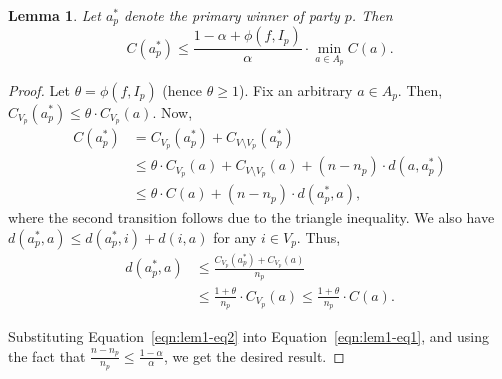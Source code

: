 \documentclass[letterpaper]{article} %
\newtheorem{lemma}[theorem]{Lemma}
\theoremstyle{definition}
\begin{document}
\begin{lemma}
\label{lem:winner-opt-same-party}
	Let $a^*_p$ denote the primary winner of party $p$. Then 
	$$
	C(a^*_p) \le \frac{1-\alpha+\phi(f,I_p)}{\alpha} \cdot \min_{a \in A_p} C(a).
	$$
\end{lemma}
\begin{proof}
	Let $\theta = \phi(f,I_p)$ (hence $\theta\geq 1$). Fix an arbitrary $a \in A_p$. Then, $C_{V_p}(a^*_p) \le \theta \cdot C_{V_p}(a)$. %
	Now, 
	\begin{align}
	C(a^*_p) &= C_{V_p}(a^*_p) + C_{V\setminus V_{p}}(a^*_p) \nonumber\\
	&\le \theta\cdot C_{V_p}(a) + C_{V\setminus V_{p}}(a) +(n-n_{p}) \cdot d(a,a^*_p) \nonumber\\
	&\le \theta \cdot C(a) + (n-n_{p}) \cdot d(a^*_p,a),
	\label{eqn:lem1-eq1}
	\end{align}
	where the second transition follows %
	due to the triangle inequality. 
	We also have $d(a^*_p,a) \le d(a^*_p,i)+d(i,a)$ for any $i \in V_p$. Thus, 
	\begin{align}
	d(a^*_p,a) &\le \frac{C_{V_p}(a^*_p)+C_{V_p}(a)}{n_p} \nonumber\\
	&\le \frac{1+\theta}{n_p} \cdot C_{V_p}(a) \le \frac{1+\theta}{n_p} \cdot C(a).
	\label{eqn:lem1-eq2}
	\end{align}
	
	Substituting Equation~\eqref{eqn:lem1-eq2} into Equation~\eqref{eqn:lem1-eq1}, and using the fact that $\frac{n-n_{p}}{n_p} \le \frac{1-\alpha}{\alpha}$, we get the desired result. 
\end{proof}
\end{document}
